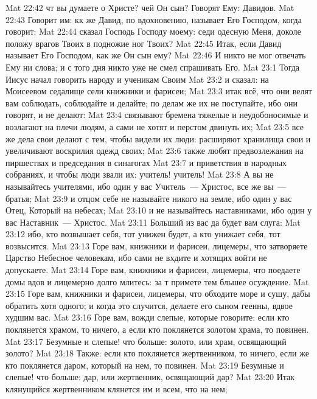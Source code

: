 \vs Mat 22:42 чт вы думаете о Христе? чей Он сын? Говорят Ему: Давидов.
\vs Mat 22:43 Говорит им: кк же Давид, по вдохновению, называет Его Господом, когда говорит:
\vs Mat 22:44 сказал Господь Господу моему: седи одесную Меня, доколе положу врагов Твоих в подножие ног Твоих?
\vs Mat 22:45 Итак, если Давид называет Его Господом, как же Он сын ему?
\vs Mat 22:46 И никто не мог отвечать Ему ни слова; и с того дня никто уже не смел спрашивать Его.
\vs Mat 23:1 Тогда Иисус начал говорить народу и ученикам Своим
\vs Mat 23:2 и сказал: на Моисеевом седалище сели книжники и фарисеи;
\vs Mat 23:3 итак всё, что они велят вам соблюдать, соблюдайте и делайте; по делам же их не поступайте, ибо они говорят, и не делают:
\vs Mat 23:4 связывают бремена тяжелые и неудобоносимые и возлагают на плечи людям, а сами не хотят и перстом двинуть их;
\vs Mat 23:5 все же дела свои делают с тем, чтобы видели их люди: расширяют хранилища свои и увеличивают воскрилия одежд своих;
\vs Mat 23:6 также любят предвозлежания на пиршествах и председания в синагогах
\vs Mat 23:7 и приветствия в народных собраниях, и чтобы люди звали их: учитель! учитель!
\vs Mat 23:8 А вы не называйтесь учителями, ибо один у вас Учитель~--- Христос, все же вы~--- братья;
\vs Mat 23:9 и отцом себе не называйте никого на земле, ибо один у вас Отец, Который на небесах;
\vs Mat 23:10 и не называйтесь наставниками, ибо один у вас Наставник~--- Христос.
\vs Mat 23:11 Больший из вас да будет вам слуга:
\vs Mat 23:12 ибо, кто возвышает себя, тот унижен будет, а кто унижает себя, тот возвысится.
\rsbpar\vs Mat 23:13 Горе вам, книжники и фарисеи, лицемеры, что затворяете Царство Небесное человекам, ибо сами не вхдите и хотящих войти не допускаете.
\vs Mat 23:14 Горе вам, книжники и фарисеи, лицемеры, что поедаете домы вдов и лицемерно долго млитесь: за т примете тем бльшее осуждение.
\vs Mat 23:15 Горе вам, книжники и фарисеи, лицемеры, что обходите море и сушу, дабы обратить хотя одного; и когда это случится, делаете его сыном геенны, вдвое худшим вас.
\vs Mat 23:16 Горе вам, вожди слепые, которые говорите: если кто поклянется храмом, то ничего, а если кто поклянется золотом храма, то повинен.
\vs Mat 23:17 Безумные и слепые! что больше: золото, или храм, освящающий золото?
\vs Mat 23:18 Также: если кто поклянется жертвенником, то ничего, если же кто поклянется даром, который на нем, то повинен.
\vs Mat 23:19 Безумные и слепые! что больше: дар, или жертвенник, освящающий дар?
\vs Mat 23:20 Итак клянущийся жертвенником клянется им и всем, что на нем;
